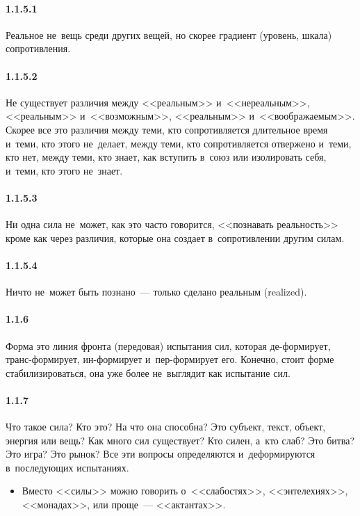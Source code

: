 \paragraph{1.1.5.1}\hypertarget{par:1.1.5.1}{} Реальное не~вещь среди других вещей, но скорее градиент (уровень, шкала) сопротивления.

\paragraph{1.1.5.2}\hypertarget{par:1.1.5.2}{} Не существует различия между <<реальным>> и~<<нереальным>>, <<реальным>> и~<<возможным>>, <<реальным>> и~<<воображаемым>>. Скорее все это различия между теми, кто сопротивляется длительное время и~теми, кто этого не~делает, между теми, кто сопротивляется отвержено и~теми, кто нет, между теми, кто знает, как вступить в~союз или изолировать себя, и~теми, кто этого не~знает.

\paragraph{1.1.5.3}\hypertarget{par:1.1.5.3}{} Ни одна сила не~может, как это часто говорится, <<познавать реальность>> кроме как через различия, которые она создает в~сопротивлении другим силам.

\paragraph{1.1.5.4}\hypertarget{par:1.1.5.4}{} Ничто не~может быть познано~--- только сделано реальным (realized).

\paragraph{1.1.6}\hypertarget{par:1.1.6}{} Форма это линия фронта (передовая) испытания сил, которая де-формирует, транс-формирует, ин-формирует и~пер-формирует его. Конечно, стоит форме стабилизироваться, она уже более не~выглядит как испытание сил.

\paragraph{1.1.7}\hypertarget{par:1.1.7}{} Что такое сила? Кто это? На что она способна? Это субъект, текст, объект, энергия или вещь? Как много сил существует? Кто силен, а~кто слаб? Это битва? Это игра?
Это рынок? Все эти вопросы определяются и~деформируются в~последующих
испытаниях.
	\begin{itemize}
	\item Вместо <<силы>> можно говорить о~<<слабостях>>, <<энтелехиях>>, <<монадах>>, или проще~--- <<актантах>>.
	\end{itemize}

